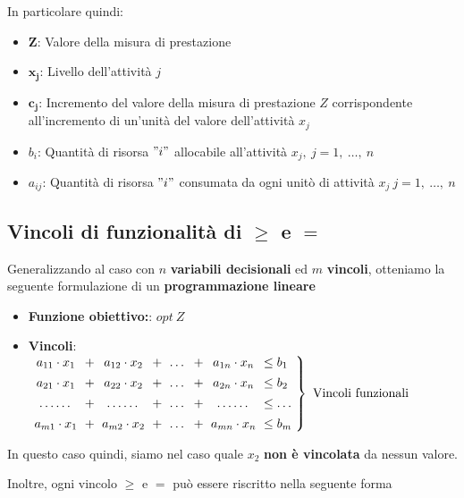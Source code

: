 In particolare quindi:
\begin{itemize}
    \item $\mathbf{Z}$: Valore della misura di prestazione
    \item $\mathbf{x_j}$: Livello dell'attività $j$
    \item $\mathbf{c_j}$: Incremento del valore della misura di prestazione $Z$ corrispondente all'incremento di un'unità del valore dell'attività $x_j$
    \item $b_i$: Quantità di risorsa $"i"$ allocabile all'attività $x_j,\ j=1,\ \dots,\ n$
    \item $a_{ij}$: Quantità di risorsa $"i"$ consumata da ogni unitò di attività $x_j\ j=1,\ \dots,\ n$
\end{itemize}

\subsection{Vincoli di funzionalità di $\geq$ e $=$}
Generalizzando al caso con $n$ \textbf{variabili decisionali} ed $m$ \textbf{vincoli}, otteniamo la seguente formulazione di un \textbf{programmazione lineare}

\begin{itemize}
    \item \textbf{Funzione obiettivo:}: $opt\ Z$
    \item \textbf{Vincoli}: 
    $
    \left.
    \setlength{\arraycolsep}{3pt}
    \begin{array}{c c c c c c c l}
        a_{11} \cdot x_1 & + & a_{12} \cdot x_2 & + & \dots & + & a_{1n} \cdot x_n & \leq b_1 \\
        [1ex]
        a_{21} \cdot x_1 & + & a_{22} \cdot x_2 & + & \dots & + & a_{2n} \cdot x_n & \leq b_2 \\
        [1ex]
        \dots\dots & + & \dots\dots & + & \dots & + & \dots\dots & \leq \dots \\
        [1ex]
        a_{m1} \cdot x_1 & + & a_{m2} \cdot x_2 & + & \dots & + & a_{mn} \cdot x_n & \leq b_m 
    \end{array}
    \right\} \text{ Vincoli funzionali}
    $
\end{itemize}

In questo caso quindi, siamo nel caso quale $x_2$ \textbf{non è vincolata} da nessun valore.

Inoltre, ogni vincolo $\geq$ e $=$ può essere riscritto nella seguente forma


